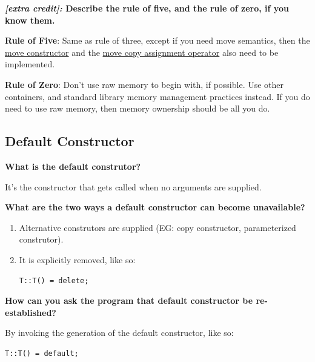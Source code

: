 \documentclass[letterpaper, 12pt]{article}
\newcommand{\question}[1]{\textbf{#1}\par}
\newenvironment{ansblock}{\color{Green4}}{\normalcolor\vspace{1em}}
\begin{document}
\question{\textit{[extra credit]:} Describe the rule of five, and the rule of
zero, if you know them.}

\begin{ansblock}
\textbf{Rule of Five}: Same as rule of three, except if you need move
semantics, then the \uline{move constructor} and the
\uline{move copy assignment operator} also need to be implemented.

\vspace{1em}

\textbf{Rule of Zero}: Don't use raw memory to begin with, if possible. Use
other containers, and standard library memory management practices instead. If you
do need to use raw memory, then memory ownership should be all you do.
\end{ansblock}

\subsection{Default Constructor}
\question{What is the default construtor?}
\begin{ansblock}
It's the constructor that gets called when no arguments are supplied.
\end{ansblock}

\question{What are the two ways a default constructor can become unavailable?}
\begin{ansblock}
\begin{enumerate}
    \item Alternative construtors are supplied (EG: copy constructor,
    parameterized construtor).
    \item It is explicitly removed, like so:
    \begin{verbatim}
T::T() = delete;
    \end{verbatim}
\end{enumerate}
\end{ansblock}

\begin{minipage}{\textwidth}
\question{How can you ask the program that default constructor be
re-established?}
\begin{ansblock}
By invoking the generation of the default constructor, like so:
\begin{verbatim}
T::T() = default;
\end{verbatim}
\end{ansblock}
\end{minipage}
\end{document}
